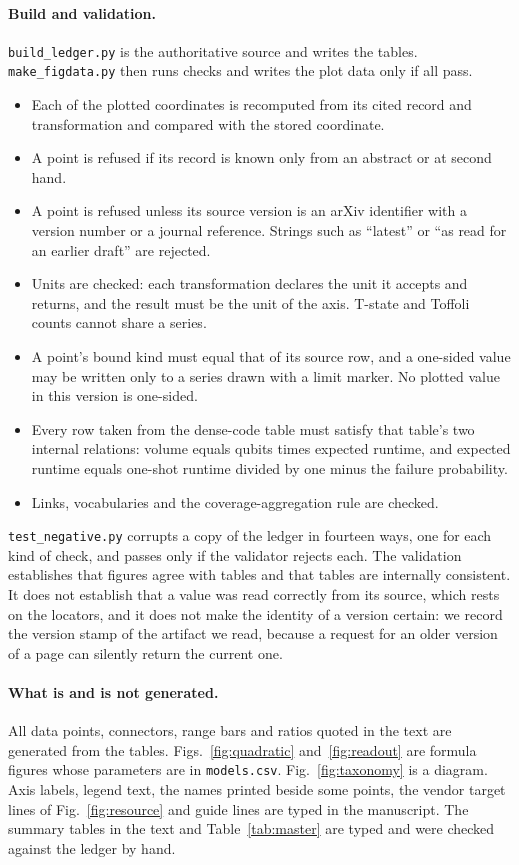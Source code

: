 \documentclass[10pt,a4paper]{article}
\begin{document}
\paragraph{Build and validation.} \texttt{build\_ledger.py} is the authoritative source and writes the tables. \texttt{make\_figdata.py} then runs \nChecks{} checks and writes the plot data only if all pass.
\begin{itemize}
\item Each of the \nCoords{} plotted coordinates is recomputed from its cited record and transformation and compared with the stored coordinate.
\item A point is refused if its record is known only from an abstract or at second hand.
\item A point is refused unless its source version is an arXiv identifier with a version number or a journal reference. Strings such as ``latest'' or ``as read for an earlier draft'' are rejected.
\item Units are checked: each transformation declares the unit it accepts and returns, and the result must be the unit of the axis. T-state and Toffoli counts cannot share a series.
\item A point's bound kind must equal that of its source row, and a one-sided value may be written only to a series drawn with a limit marker. No plotted value in this version is one-sided.
\item Every row taken from the dense-code table must satisfy that table's two internal relations: volume equals qubits times expected runtime, and expected runtime equals one-shot runtime divided by one minus the failure probability.
\item Links, vocabularies and the coverage-aggregation rule are checked.
\end{itemize}
\texttt{test\_negative.py} corrupts a copy of the ledger in fourteen ways, one for each kind of check, and passes only if the validator rejects each. The validation establishes that figures agree with tables and that tables are internally consistent. It does not establish that a value was read correctly from its source, which rests on the locators, and it does not make the identity of a version certain: we record the version stamp of the artifact we read, because a request for an older version of a page can silently return the current one.

\paragraph{What is and is not generated.} All data points, connectors, range bars and ratios quoted in the text are generated from the tables. Figs.~\ref{fig:quadratic} and~\ref{fig:readout} are formula figures whose parameters are in \texttt{models.csv}. Fig.~\ref{fig:taxonomy} is a diagram. Axis labels, legend text, the names printed beside some points, the vendor target lines of Fig.~\ref{fig:resource} and guide lines are typed in the manuscript. The summary tables in the text and Table~\ref{tab:master} are typed and were checked against the ledger by hand.
\end{document}
